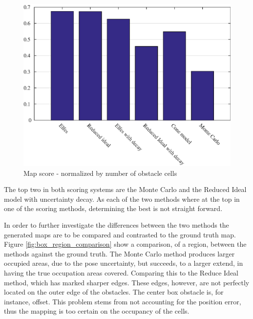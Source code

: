 \begin{figure}
	\centering
	\includegraphics[scale=1]{figures/static_mapping/comparison_obstacle_error_per_cell}
	\caption{Map score - normalized by number of obstacle cells}
	\label{fig:comparison_obstacle_error_per_cell}
\end{figure}

The top two in both scoring systems are the Monte Carlo and the Reduced Ideal model with uncertainty decay. As each of the two methods where at the top in one of the scoring methods, determining the best is not straight forward.

In order to further investigate the differences between the two methods the generated maps are to be compared and contrasted to the ground truth map. 
Figure \ref{fig:box_region_comparison} show a comparison, of a region, between the methods against the ground truth.
The Monte Carlo method produces larger occupied areas, due to the pose uncertainty, but succeeds, to a larger extend, in having the true occupation areas covered. 
Comparing this to the Reduce Ideal method, which has marked sharper edges. 
These edges, however, are not perfectly located on the outer edge of the obstacles. 
The center box obstacle is, for instance, offset. 
This problem stems from not accounting for the position error, thus the mapping is too certain on the occupancy of the cells. 

